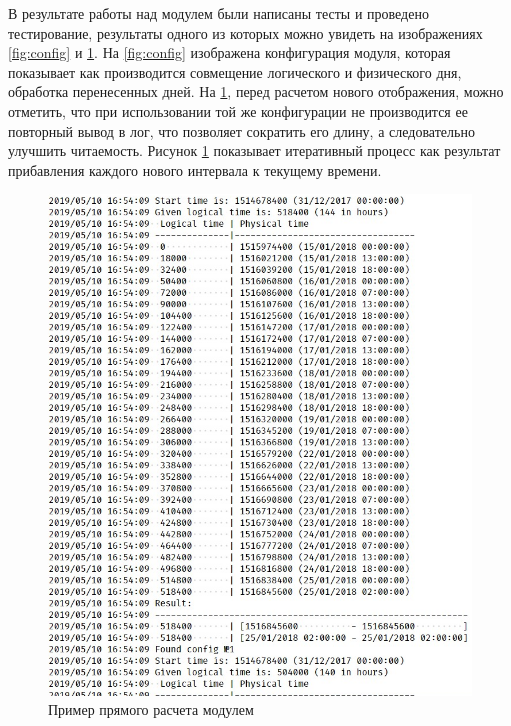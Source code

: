 \indent В результате работы над модулем были написаны тесты и проведено тестирование, результаты одного из которых можно увидеть на изображениях \ref{fig:config} и \ref{fig:eval1}.
На \ref{fig:config} изображена конфигурация модуля, которая показывает как производится совмещение логического и физического дня, обработка перенесенных дней.
На \ref{fig:eval1}, перед расчетом нового отображения, можно отметить, что при использовании той же конфигурации не производится ее повторный вывод в лог, что позволяет сократить его длину, а следовательно улучшить читаемость.
Рисунок \ref{fig:eval1} показывает итеративный процесс как результат прибавления каждого нового интервала к текущему времени.

\begin{figure}[ht]
	\includegraphics[scale=0.6]{pics/scheduleEvalExample.png}
	\caption{Пример прямого расчета модулем}
	\label{fig:eval1}
	\centering
\end{figure}


